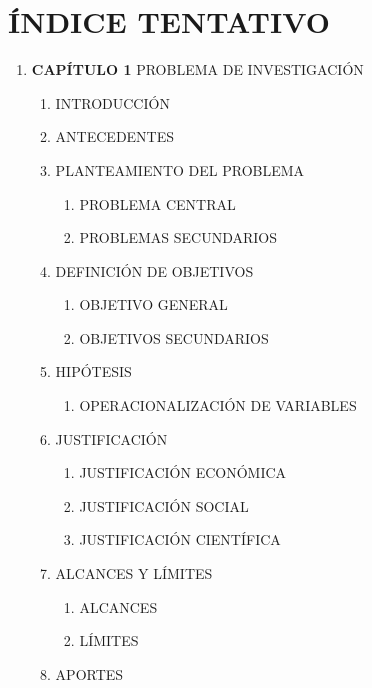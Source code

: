 \chapter{ÍNDICE TENTATIVO}
\begin{enumerate}[nosep, label*=\arabic*.]
    \item \textbf{CAPÍTULO 1} PROBLEMA DE INVESTIGACIÓN
    \begin{enumerate}[nosep, label*=\arabic*.]
        \item INTRODUCCIÓN
        \item ANTECEDENTES
        \item PLANTEAMIENTO DEL PROBLEMA
        \begin{enumerate}[nosep, label*=\arabic*.]
            \item PROBLEMA CENTRAL
            \item PROBLEMAS SECUNDARIOS
        \end{enumerate}
        \item DEFINICIÓN DE OBJETIVOS
        \begin{enumerate}[nosep, label*=\arabic*.]
            \item OBJETIVO GENERAL
            \item OBJETIVOS SECUNDARIOS
        \end{enumerate}
        \item HIPÓTESIS
        \begin{enumerate}[nosep, label*=\arabic*.]
            \item OPERACIONALIZACIÓN DE VARIABLES
        \end{enumerate}
        \item JUSTIFICACIÓN
        \begin{enumerate}[nosep, label*=\arabic*.]
            \item JUSTIFICACIÓN ECONÓMICA
            \item JUSTIFICACIÓN SOCIAL
            \item JUSTIFICACIÓN CIENTÍFICA
        \end{enumerate}
        \item ALCANCES Y LÍMITES
        \begin{enumerate}[nosep, label*=\arabic*.]
            \item ALCANCES
            \item LÍMITES
        \end{enumerate}
        \item APORTES
        \begin{enumerate}[nosep, label*=\arabic*.]

\end{enumerate}
\end{enumerate}
\end{enumerate}
